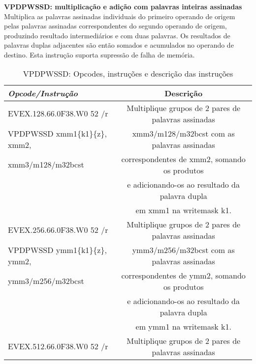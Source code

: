 \documentclass[12pt,a4paper,brazilian,utf8]{ppgsi}
\begin{document}
    \textbf{VPDPWSSD: multiplicação e adição com palavras inteiras assinadas}
    Multiplica as palavras assinadas individuais do primeiro operando de origem pelas palavras assinadas correspondentes do segundo operando de origem, produzindo resultado intermediários e com duas palavras. Os resultados de palavras duplas adjacentes são então somados e acumulados no operando de destino. Esta instrução suporta supressão de falha de memória.
    \begin{table}[H]
        \centering
        \caption{VPDPWSSD: Opcodes, instruções e descrição das instruções}
            \begin{tabular}{|l|c|}
                \hline
                    \emph{Opcode/Instrução} & Descrição\\
                \hline
        	        EVEX.128.66.0F38.W0 52 /r 
        	        & Multiplique grupos de 2 pares de palavras assinadas\\
        	        
        	        VPDPWSSD xmm1\{k1\}\{z\}, xmm2, 
        	        & xmm3/m128/m32bcst com as palavras assinadas\\
        	        
        	        xmm3/m128/m32bcst & correspondentes de xmm2, somando os produtos\\ 
        	        &  e adicionando-os ao resultado da palavra dupla\\
        	        
        	        &  em xmm1 na writemask  k1.\\
                \hline
        	        EVEX.256.66.0F38.W0 52 /r 
        	        & Multiplique grupos de 2 pares de palavras assinadas\\
        	        
        	        VPDPWSSD ymm1\{k1\}\{z\}, ymm2, 
        	        & ymm3/m256/m32bcst com as palavras assinadas\\
        	        
        	        ymm3/m256/m32bcst & correspondentes de ymm2, somando os produtos\\ 
        	        &  e adicionando-os ao resultado da palavra dupla\\
        	        
        	        &  em ymm1 na writemask  k1.\\
        	    
                \hline
        	        EVEX.512.66.0F38.W0 52 /r 
        	        & Multiplique grupos de 2 pares de palavras assinadas\\
        	        

\end{tabular}
\end{table}
\end{document}
